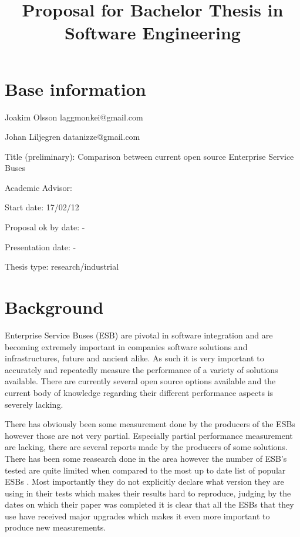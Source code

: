 \documentclass[10pt,a4paper]{proposal}
\title{Proposal for Bachelor Thesis in Software Engineering}
\begin{document}
\maketitle
\thispagestyle{fancy}


\section*{Base information}

Joakim Olsson laggmonkei@gmail.com

Johan Liljegren datanizze@gmail.com

Title (preliminary): Comparison between current open source Enterprise Service Buses

Academic Advisor:  

Start date: 17/02/12

Proposal ok by date: -

Presentation date: -


Thesis type: research\slash industrial


\section*{Background}


Enterprise Service Buses (ESB) \cite{falko07} are pivotal in software integration and are becoming extremely important in companies software solutions and  infrastructures, future and ancient alike. \cite{fenner03}
As such it is very important to accurately and repeatedly measure the performance of a variety of solutions available. 
There are currently several open source options available \cite{mehta11} and the current body of knowledge regarding their different performance aspects is severely lacking. 


There has obviously been some measurement done by the producers of the ESBs however those are not very partial. Especially partial performance measurement are lacking, there are several reports made by the producers of some solutions. \cite{Perera07,mulevsjboss,mulevsglassfish,mulevsservicemix,mulesoft08} There has been some reasearch done in the area \cite{ESBthesis} however the number of ESB's tested are quite limited when compared to the most up to date list of popular ESBs \cite{mehta11}. Most importantly they do not explicitly declare what version they are using in their tests which makes their results hard to reproduce, judging by the dates on which their paper
 was completed it is clear that all the ESBs that they use have received major upgrades which makes it even more important to produce new measurements.
\end{document}
